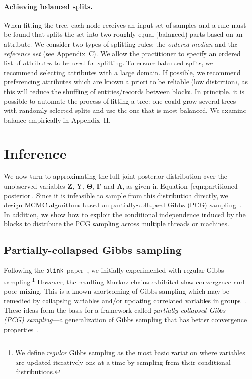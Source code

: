 \documentclass[12pt,letterpaper]{article}
\renewcommand\vec{\bm}
\newcommand{\1}[1]{\mathbb{I}\!\left[#1\right]} %
\newcommand{\blink}{\texttt{\upshape \lowercase{blink}}} %
\begin{document}
\paragraph{Achieving balanced splits.}
When fitting the tree, each node receives an input set of samples and a rule 
must be found that splits the set into two roughly equal (balanced) parts 
based on an attribute.
We consider two types of splitting rules: the \emph{ordered median} and 
the \emph{reference set} (see Appendix~C).
We allow the practitioner to specify an ordered list of attributes to be 
used for splitting.
To ensure balanced splits, we recommend selecting attributes with a 
large domain.
If possible, we recommend preferencing attributes which are known a priori 
to be reliable (low distortion), as this will reduce the shuffling of 
entities\slash records between blocks.
In principle, it is possible to automate the process of fitting a tree: 
one could grow several trees with randomly-selected splits and use the 
one that is most balanced.
We examine balance empirically in Appendix~H.

\section{Inference}
\label{sec:inference}
We now turn to approximating the full joint posterior distribution 
over the unobserved variables $\vec{Z}$, $\vec{Y}$, $\vec{\Theta}$, 
$\vec{\Gamma}$ and $\vec{\Lambda}$, as given in 
Equation~\ref{eqn:partitioned-posterior}.
Since it is infeasible to sample from this distribution directly, 
we design MCMC algorithms based on partially-collapsed Gibbs (PCG) 
sampling~\citep{dyk_partially_2008}.
In addition, we show how to exploit the conditional independence 
induced by the blocks to distribute the PCG sampling across multiple 
threads or machines.

\subsection{Partially-collapsed Gibbs sampling}
\label{sec:pcg-sampling}
Following the \blink\ paper~\citep{steorts_entity_2015}, we initially 
experimented with regular Gibbs sampling.\footnote{
  We define \emph{regular} Gibbs sampling as the most basic variation 
  where variables are updated iteratively one-at-a-time by sampling 
  from their conditional distributions.
} 
However, the resulting Markov chains exhibited slow convergence and poor 
mixing.
This is a known shortcoming of Gibbs sampling which may be remedied by 
collapsing variables and\slash or updating correlated variables in 
groups~\citep{liu_monte_2004}.
These ideas form the basis for a framework called \emph{partially-collapsed 
Gibbs (PCG) sampling}---a generalization of Gibbs sampling that has better 
convergence properties~\citep{dyk_partially_2008}.
\end{document}
